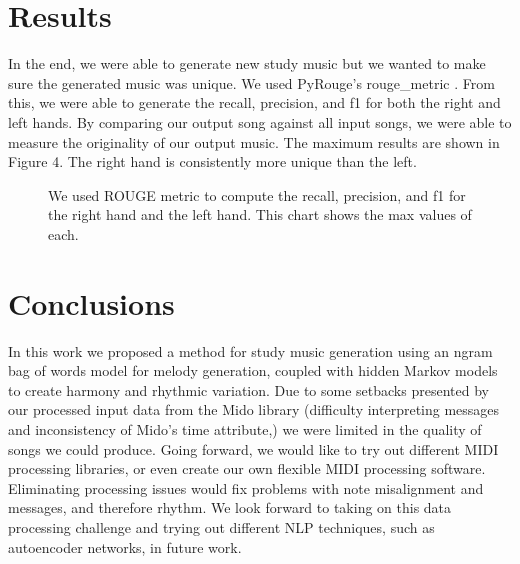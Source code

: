 \documentclass{article}
\begin{document}
\section{Results}
In the end, we were able to generate new study music but we wanted to make sure the generated music was unique. We used PyRouge’s rouge\_metric  \cite{rouge}.  From this, we were able to generate the recall, precision, and f1 for both the right and left hands. By comparing our output song against all input songs, we were able to measure the originality of our output music. The maximum results are shown in Figure 4. The right hand is consistently more unique than the left. 

\begin{figure}[ht]
\centering
{}
\caption{We used ROUGE metric to compute the recall, precision, and f1 for the right hand and the left hand. This chart shows the max values of each.}
\end{figure}

\section{Conclusions}
In this work we proposed a method for study music generation using an ngram bag of words model for melody generation, coupled with hidden Markov models to create harmony and rhythmic variation. Due to some setbacks presented by our processed input data from the Mido library (difficulty interpreting messages and inconsistency of Mido’s time attribute,) we were limited in the quality of songs we could produce. Going forward, we would like to try out different MIDI processing libraries, or even create our own flexible MIDI processing software. Eliminating processing issues would fix problems with note misalignment and messages, and therefore rhythm. We look forward to taking on this data processing challenge and trying out different NLP techniques, such as autoencoder networks, in future work. 
\end{document}

